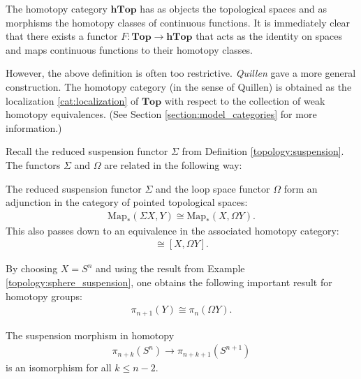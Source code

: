     \begin{property}
        The homotopy category $\mathbf{hTop}$ has as objects the topological spaces and as morphisms the homotopy classes of continuous functions. It is immediately clear that there exists a functor $F:\mathbf{Top}\rightarrow\mathbf{hTop}$ that acts as the identity on spaces and maps continuous functions to their homotopy classes.

        However, the above definition is often too restrictive. \textit{Quillen} gave a more general construction. The homotopy category (in the sense of Quillen) is obtained as the localization \ref{cat:localization} of $\mathbf{Top}$ with respect to the collection of weak homotopy equivalences. (See Section \ref{section:model_categories} for more information.)
    \end{property}

    Recall the reduced suspension functor $\Sigma$ from Definition \ref{topology:suspension}. The functors $\Sigma$ and $\Omega$ are related in the following way:
    \begin{property}\label{topology:eckmann_hilton}
        The reduced suspension functor $\Sigma$ and the loop space functor $\Omega$ form an adjunction in the category of pointed topological spaces:
        \begin{gather}
            \text{Map}_*(\Sigma X,Y)\cong\text{Map}_*(X,\Omega Y).
        \end{gather}
        This also passes down to an equivalence in the associated homotopy category:
        \begin{gather}
            [\Sigma X,Y]\cong[X,\Omega Y].
        \end{gather}
    \end{property}
    \begin{result}
        By choosing $X=S^n$ and using the result from Example \ref{topology:sphere_suspension}, one obtains the following important result for homotopy groups:
        \begin{gather}
            \pi_{n+1}(Y)\cong\pi_n(\Omega Y).
        \end{gather}
    \end{result}

    \begin{theorem}\label{topology:freudenthal}
        The suspension morphism in homotopy
        \begin{gather}
            \pi_{n+k}(S^n)\rightarrow\pi_{n+k+1}(S^{n+1})
        \end{gather}
        is an isomorphism for all $k\leq n-2$.
    \end{theorem}

